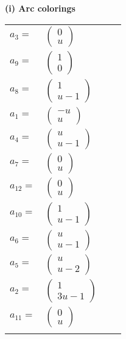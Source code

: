 \documentclass[1p]{elsarticle_modified}
\theoremstyle{definition}
\begin{document}
\flushleft \textbf{(i) Arc colorings}\\
\begin{tabular}{m{7pt} m{180pt} m{7pt} m{180pt} }
\flushright $a_{3}=$&$\begin{pmatrix}0\\u\end{pmatrix}$ \\
\flushright $a_{9}=$&$\begin{pmatrix}1\\0\end{pmatrix}$ \\
\flushright $a_{8}=$&$\begin{pmatrix}1\\u-1\end{pmatrix}$ \\
\flushright $a_{1}=$&$\begin{pmatrix}- u\\u\end{pmatrix}$ \\
\flushright $a_{4}=$&$\begin{pmatrix}u\\u-1\end{pmatrix}$ \\
\flushright $a_{7}=$&$\begin{pmatrix}0\\u\end{pmatrix}$ \\
\flushright $a_{12}=$&$\begin{pmatrix}0\\u\end{pmatrix}$ \\
\flushright $a_{10}=$&$\begin{pmatrix}1\\u-1\end{pmatrix}$ \\
\flushright $a_{6}=$&$\begin{pmatrix}u\\u-1\end{pmatrix}$ \\
\flushright $a_{5}=$&$\begin{pmatrix}u\\u-2\end{pmatrix}$ \\
\flushright $a_{2}=$&$\begin{pmatrix}1\\3 u-1\end{pmatrix}$ \\
\flushright $a_{11}=$&$\begin{pmatrix}0\\u\end{pmatrix}$\\&\end{tabular}
\end{document}
